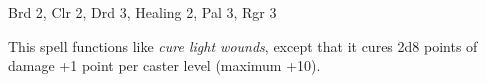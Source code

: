 
\begin{description*}
\item[Level:] Brd 2, Clr 2, Drd 3, Healing 2, Pal 3, Rgr 3
\end{description*}

This spell functions like \textit{cure light wounds}, except that it cures 2d8
points of damage +1 point per caster level (maximum +10).